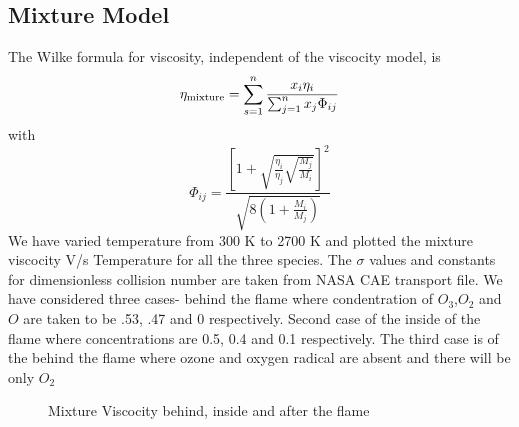 \subsection{Mixture Model}
\noindent The Wilke formula for viscosity, independent of
the viscocity model, is
\begin{equation}
\eta_{\textnormal{mixture}} = \sum_{s=1}^{n} \frac {x_i \eta_i}{\sum_{j=1}^{n} x_j \Phi_{ij}}
\end{equation}
with
\begin{equation}
\Phi_{ij} = \frac{
                \left[
                     1 + \sqrt{\frac{\eta_i}{\eta_j}\sqrt{\frac{M_j}{M_i}}}
                \right]^2
                }{\sqrt{8\left(1 + \frac{M_i}{M_j}\right)}}
\end{equation}
\noindent  We have varied temperature from 300 K to 2700 K and plotted the mixture viscocity V/s Temperature for all the  three species. The $\sigma$ values and constants for dimensionless collision number are taken from NASA CAE transport file. We have considered three cases-  behind the flame where condentration of $O_3$,$O_2$ and $O$ are taken to be .53, .47 and 0 respectively. Second case of the inside of the flame where concentrations are 0.5, 0.4 and 0.1 respectively. The third case is of the behind the flame where ozone and oxygen radical are absent and there will be only $O_2$




\begin{figure}[H]


    \caption{Mixture Viscocity behind, inside and after the flame}
\end{figure}



